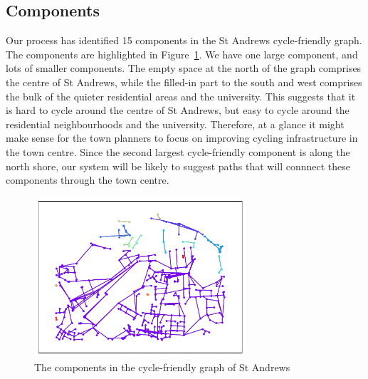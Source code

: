 \documentclass[12pt,a4paper]{report}
\begin{document}
\subsection{Components}\label{sec:components}
Our process has identified 15 components in the St Andrews cycle-friendly graph. The components are highlighted in Figure~\ref{fig:components st andrews}. We have one large component, and lots of smaller components. The empty space at the north of the graph comprises the centre of St Andrews, while the filled-in part to the south and west comprises the bulk of the quieter residential areas and the university. This suggests that it is hard to cycle around the centre of St Andrews, but easy to cycle around the residential neighbourhoods and the university. Therefore, at a glance it might make sense for the town planners to focus on improving cycling infrastructure in the town centre. Since the second largest cycle-friendly component is along the north shore, our system will be likely to suggest paths that will connnect these components through the town centre.

\begin{figure}[ht]
    \centering
    \includegraphics[width=0.7\textwidth,trim={1cm 1cm 1cm 1cm},clip]{diss_images/eval/components_st_andrews.png}
    \caption{The components in the cycle-friendly graph of St Andrews}
    \label{fig:components st andrews}
\end{figure}
\end{document}
